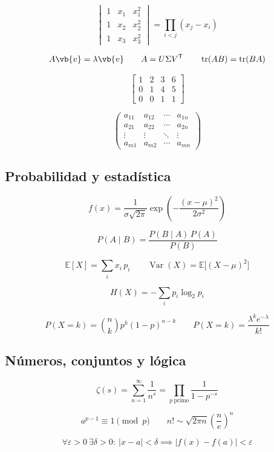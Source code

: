 \[ \begin{vmatrix} 1 & x_1 & x_1^2 \\ 1 & x_2 & x_2^2 \\ 1 & x_3 & x_3^2 \end{vmatrix}=\prod_{i<j}(x_j-x_i) \]

\[ A\vb{v}=\lambda\vb{v} \qquad A=U\Sigma V^{\mathsf{T}} \qquad \operatorname{tr}(AB)=\operatorname{tr}(BA) \]

\[ \left[\begin{array}{ccc|c} 1 & 2 & 3 & 6 \\ 0 & 1 & 4 & 5 \\ 0 & 0 & 1 & 1 \end{array}\right] \]

\[ \begin{pmatrix} a_{11} & a_{12} & \cdots & a_{1n} \\ a_{21} & a_{22} & \cdots & a_{2n} \\ \vdots & \vdots & \ddots & \vdots \\ a_{m1} & a_{m2} & \cdots & a_{mn} \end{pmatrix} \]

\subsection{Probabilidad y estadística}

\[ f(x)=\frac{1}{\sigma\sqrt{2\pi}}\exp\left(-\frac{(x-\mu)^2}{2\sigma^2}\right) \]

\[ P(A\mid B)=\frac{P(B\mid A)\,P(A)}{P(B)} \]

\[ \mathbb{E}[X]=\sum_i x_i\,p_i \qquad \operatorname{Var}(X)=\mathbb{E}\big[(X-\mu)^2\big] \]

\[ H(X)=-\sum_{i}p_i\log_2 p_i \]

\[ P(X=k)=\binom{n}{k}p^k(1-p)^{n-k} \qquad P(X=k)=\frac{\lambda^k e^{-\lambda}}{k!} \]

\subsection{Números, conjuntos y lógica}

\[ \zeta(s)=\sum_{n=1}^{\infty}\frac{1}{n^s}=\prod_{p\ \text{primo}}\frac{1}{1-p^{-s}} \]

\[ a^{p-1}\equiv 1 \pmod{p} \qquad n!\sim\sqrt{2\pi n}\left(\frac{n}{e}\right)^n \]

\[ \forall\varepsilon>0\ \exists\delta>0:\ |x-a|<\delta\implies|f(x)-f(a)|<\varepsilon \]

